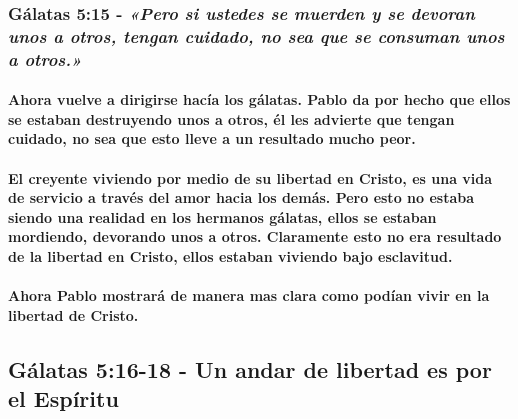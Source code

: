 \documentclass[11a pt,twoside]{article}
\newcommand{\scripture}[1]{%
  {\fontsize{12pt}{16pt}\selectfont\ScriptureFont\itshape #1}%
}
\let\oldsubsection\subsection
\renewcommand{\subsection}{\needspace{5\baselineskip}\oldsubsection}
\let\oldsubsubsection\subsubsection
\renewcommand{\subsubsection}{\needspace{4\baselineskip}\oldsubsubsection}
\let\oldparagraph\paragraph
\renewcommand{\paragraph}{\needspace{3\baselineskip}\oldparagraph}
\begin{document}
\subsubsection{\texorpdfstring{Gálatas 5:15 -
\scripture{«Pero si ustedes se muerden y se devoran unos a otros, tengan cuidado, no sea que se consuman unos a otros.»}}{Gálatas 5:15 - }}\label{guxe1latas-515---pero-si-ustedes-se-muerden-y-se-devoran-unos-a-otros-tengan-cuidado-no-sea-que-se-consuman-unos-a-otros.}

\paragraph{Ahora vuelve a dirigirse hacía los gálatas. Pablo da por
hecho que ellos se estaban destruyendo unos a otros, él les advierte que
tengan cuidado, no sea que esto lleve a un resultado mucho
peor.}\label{ahora-vuelve-a-dirigirse-hacuxeda-los-guxe1latas.-pablo-da-por-hecho-que-ellos-se-estaban-destruyendo-unos-a-otros-uxe9l-les-advierte-que-tengan-cuidado-no-sea-que-esto-lleve-a-un-resultado-mucho-peor.}

\paragraph{El creyente viviendo por medio de su libertad en Cristo, es
una vida de servicio a través del amor hacia los demás. Pero esto no
estaba siendo una realidad en los hermanos gálatas, ellos se estaban
mordiendo, devorando unos a otros. Claramente esto no era resultado de
la libertad en Cristo, ellos estaban viviendo bajo
esclavitud.}\label{el-creyente-viviendo-por-medio-de-su-libertad-en-cristo-es-una-vida-de-servicio-a-travuxe9s-del-amor-hacia-los-demuxe1s.-pero-esto-no-estaba-siendo-una-realidad-en-los-hermanos-guxe1latas-ellos-se-estaban-mordiendo-devorando-unos-a-otros.-claramente-esto-no-era-resultado-de-la-libertad-en-cristo-ellos-estaban-viviendo-bajo-esclavitud.}

\paragraph{Ahora Pablo mostrará de manera mas clara como podían vivir en
la libertad de
Cristo.}\label{ahora-pablo-mostraruxe1-de-manera-mas-clara-como-poduxedan-vivir-en-la-libertad-de-cristo.}

\subsection{Gálatas 5:16-18 - Un andar de libertad es por el
Espíritu}\label{guxe1latas-516-18---un-andar-de-libertad-es-por-el-espuxedritu}
\end{document}
